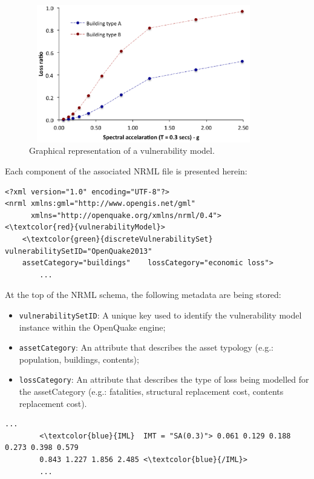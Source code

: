 \begin{figure}[ht]
\centering
\includegraphics[width=10cm,height=6cm]{./figures/risk/vulnerabilityModel.eps}
\caption{Graphical representation of a vulnerability model.}
\label{fig:vulModel}
\end{figure}

Each component of the associated NRML file is presented herein:
 
\begin{Verbatim}[frame=single, commandchars=\\\{\}, samepage=true]
<?xml version="1.0" encoding="UTF-8"?>
<nrml xmlns:gml="http://www.opengis.net/gml"
      xmlns="http://openquake.org/xmlns/nrml/0.4">
<\textcolor{red}{vulnerabilityModel}>
    <\textcolor{green}{discreteVulnerabilitySet} vulnerabilitySetID="OpenQuake2013"	
    assetCategory="buildings"    lossCategory="economic loss">
        ...
\end{Verbatim}

At the top of the NRML schema, the following metadata are being stored:
\begin{itemize}
\item  \Verb+vulnerabilitySetID+: A unique key used to identify the \gls{vulnerability model} instance within the OpenQuake engine;
\item  \Verb+assetCategory+: An attribute that describes the asset typology (e.g.: population, buildings, contents);
\item  \Verb+lossCategory+: An attribute that describes the type of loss being modelled for the assetCategory (e.g.: fatalities, structural replacement cost, contents replacement cost). 
\end{itemize}

\begin{Verbatim}[frame=single, commandchars=\\\{\}, samepage=true]
    ...
        <\textcolor{blue}{IML}  IMT = "SA(0.3)"> 0.061 0.129 0.188 0.273 0.398 0.579 
        0.843 1.227 1.856 2.485 <\textcolor{blue}{/IML}>
        ...
\end{Verbatim}

